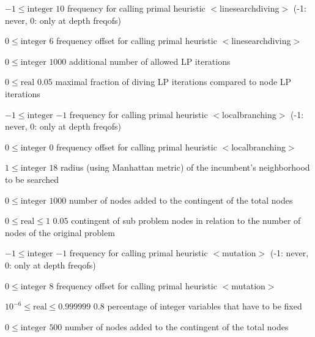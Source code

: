 %
{$-1\leq\textrm{integer}$}%
{$10$}%
{frequency for calling primal heuristic $<$linesearchdiving$>$ (-1: never, 0: only at depth freqofs)}%
{}

%
{$0\leq\textrm{integer}$}%
{$6$}%
{frequency offset for calling primal heuristic $<$linesearchdiving$>$}%
{}

%
{$0\leq\textrm{integer}$}%
{$1000$}%
{additional number of allowed LP iterations}%
{}

%
{$0\leq\textrm{real}$}%
{$0.05$}%
{maximal fraction of diving LP iterations compared to node LP iterations}%
{}

%
{$-1\leq\textrm{integer}$}%
{$-1$}%
{frequency for calling primal heuristic $<$localbranching$>$ (-1: never, 0: only at depth freqofs)}%
{}

%
{$0\leq\textrm{integer}$}%
{$0$}%
{frequency offset for calling primal heuristic $<$localbranching$>$}%
{}

%
{$1\leq\textrm{integer}$}%
{$18$}%
{radius (using Manhattan metric) of the incumbent's neighborhood to be searched}%
{}

%
{$0\leq\textrm{integer}$}%
{$1000$}%
{number of nodes added to the contingent of the total nodes}%
{}

%
{$0\leq\textrm{real}\leq1$}%
{$0.05$}%
{contingent of sub problem nodes in relation to the number of nodes of the original problem}%
{}

%
{$-1\leq\textrm{integer}$}%
{$-1$}%
{frequency for calling primal heuristic $<$mutation$>$ (-1: never, 0: only at depth freqofs)}%
{}

%
{$0\leq\textrm{integer}$}%
{$8$}%
{frequency offset for calling primal heuristic $<$mutation$>$}%
{}

%
{$10^{- 6}\leq\textrm{real}\leq0.999999$}%
{$0.8$}%
{percentage of integer variables that have to be fixed}%
{}

%
{$0\leq\textrm{integer}$}%
{$500$}%
{number of nodes added to the contingent of the total nodes}%
{}

